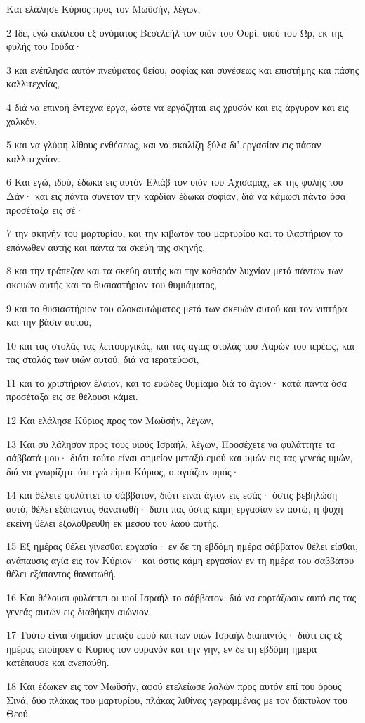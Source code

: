 \par Και ελάλησε Κύριος προς τον Μωϋσήν, λέγων,
\par 2 Ιδέ, εγώ εκάλεσα εξ ονόματος Βεσελεήλ τον υιόν του Ουρί, υιού του Ωρ, εκ της φυλής του Ιούδα·
\par 3 και ενέπλησα αυτόν πνεύματος θείου, σοφίας και συνέσεως και επιστήμης και πάσης καλλιτεχνίας,
\par 4 διά να επινοή έντεχνα έργα, ώστε να εργάζηται εις χρυσόν και εις άργυρον και εις χαλκόν,
\par 5 και να γλύφη λίθους ενθέσεως, και να σκαλίζη ξύλα δι' εργασίαν εις πάσαν καλλιτεχνίαν.
\par 6 Και εγώ, ιδού, έδωκα εις αυτόν Ελιάβ τον υιόν του Αχισαμάχ, εκ της φυλής του Δάν· και εις πάντα συνετόν την καρδίαν έδωκα σοφίαν, διά να κάμωσι πάντα όσα προσέταξα εις σέ·
\par 7 την σκηνήν του μαρτυρίου, και την κιβωτόν του μαρτυρίου και το ιλαστήριον το επάνωθεν αυτής και πάντα τα σκεύη της σκηνής,
\par 8 και την τράπεζαν και τα σκεύη αυτής και την καθαράν λυχνίαν μετά πάντων των σκευών αυτής και το θυσιαστήριον του θυμιάματος,
\par 9 και το θυσιαστήριον του ολοκαυτώματος μετά των σκευών αυτού και τον νιπτήρα και την βάσιν αυτού,
\par 10 και τας στολάς τας λειτουργικάς, και τας αγίας στολάς του Ααρών του ιερέως, και τας στολάς των υιών αυτού, διά να ιερατεύωσι,
\par 11 και το χριστήριον έλαιον, και το ευώδες θυμίαμα διά το άγιον· κατά πάντα όσα προσέταξα εις σε θέλουσι κάμει.
\par 12 Και ελάλησε Κύριος προς τον Μωϋσήν, λέγων,
\par 13 Και συ λάλησον προς τους υιούς Ισραήλ, λέγων, Προσέχετε να φυλάττητε τα σάββατά μου· διότι τούτο είναι σημείον μεταξύ εμού και υμών εις τας γενεάς υμών, διά να γνωρίζητε ότι εγώ είμαι Κύριος, ο αγιάζων υμάς·
\par 14 και θέλετε φυλάττει το σάββατον, διότι είναι άγιον εις εσάς· όστις βεβηλώση αυτό, θέλει εξάπαντος θανατωθή· διότι πας όστις κάμη εργασίαν εν αυτώ, η ψυχή εκείνη θέλει εξολοθρευθή εκ μέσου του λαού αυτής.
\par 15 Εξ ημέρας θέλει γίνεσθαι εργασία· εν δε τη εβδόμη ημέρα σάββατον θέλει είσθαι, ανάπαυσις αγία εις τον Κύριον· και όστις κάμη εργασίαν εν τη ημέρα του σαββάτου θέλει εξάπαντος θανατωθή.
\par 16 Και θέλουσι φυλάττει οι υιοί Ισραήλ το σάββατον, διά να εορτάζωσιν αυτό εις τας γενεάς αυτών εις διαθήκην αιώνιον.
\par 17 Τούτο είναι σημείον μεταξύ εμού και των υιών Ισραήλ διαπαντός· διότι εις εξ ημέρας εποίησεν ο Κύριος τον ουρανόν και την γην, εν δε τη εβδόμη ημέρα κατέπαυσε και ανεπαύθη.
\par 18 Και έδωκεν εις τον Μωϋσήν, αφού ετελείωσε λαλών προς αυτόν επί του όρους Σινά, δύο πλάκας του μαρτυρίου, πλάκας λιθίνας γεγραμμένας με τον δάκτυλον του Θεού.

